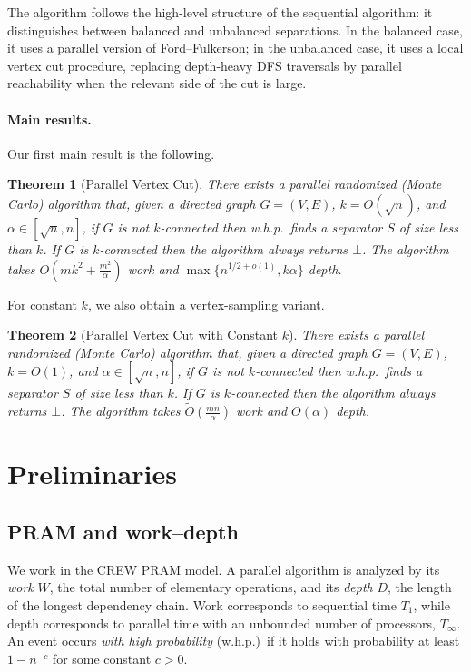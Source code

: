 \documentclass[11pt]{article}
\newtheorem{theorem}{Theorem}[section]
\theoremstyle{remark}
\newcommand{\tildeO}{\widetilde{O}}
\begin{document}
The algorithm follows the high-level structure of the sequential algorithm: it distinguishes between balanced and unbalanced separations. In the balanced case, it uses a parallel version of Ford--Fulkerson; in the unbalanced case, it uses a local vertex cut procedure, replacing depth-heavy DFS traversals by parallel reachability when the relevant side of the cut is large.

\paragraph{Main results.} Our first main result is the following.

\begin{theorem}[Parallel Vertex Cut]
\label{thm:parallel-vc}
There exists a parallel randomized (Monte Carlo) algorithm that, given a directed graph \(G = (V, E)\), \(k = O(\sqrt{n})\), and \(\alpha \in \left[\sqrt{n}, n\right]\), if \(G\) is not \(k\)-connected then \emph{w.h.p.}\ finds a separator \(S\) of size less than \(k\). If \(G\) is \(k\)-connected then the algorithm always returns \(\bot\). The algorithm takes \(\tildeO(mk^2 + \frac{m^2}{\alpha})\) work and \(\max \{n^{1/2 +o(1)}, k\alpha \}\) depth.
\end{theorem}

For constant \(k\), we also obtain a vertex-sampling variant.

\begin{theorem}[Parallel Vertex Cut with Constant \(k\)]
\label{thm:parallel-vc-constant}
There exists a parallel randomized (Monte Carlo) algorithm that, given a directed graph \(G = (V, E)\), \(k = O(1)\), and \(\alpha \in \left[\sqrt{n}, n\right]\), if \(G\) is not \(k\)-connected then \emph{w.h.p.}\ finds a separator \(S\) of size less than \(k\). If \(G\) is \(k\)-connected then the algorithm always returns \(\bot\). The algorithm takes \(\tildeO(\frac{mn}{\alpha})\) work and \(O(\alpha)\) depth.
\end{theorem}

\section{Preliminaries}

\subsection{PRAM and work--depth}
We work in the CREW PRAM model. A parallel algorithm is analyzed by its \emph{work} \(W\), the total number of elementary operations, and its \emph{depth} \(D\), the length of the longest dependency chain. Work corresponds to sequential time \(T_1\), while depth corresponds to parallel time with an unbounded number of processors, \(T_\infty\). An event occurs \emph{with high probability} (w.h.p.)\ if it holds with probability at least \(1-n^{-c}\) for some constant \(c>0\).
\end{document}
